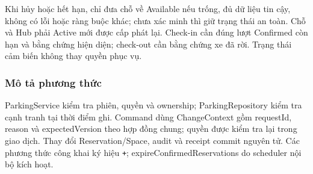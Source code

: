 Khi hủy hoặc hết hạn, chỉ đưa chỗ về Available nếu trống, đủ dữ liệu tin cậy, không có lỗi hoặc ràng buộc khác; chưa xác minh thì giữ trạng thái an toàn. Chỗ và Hub phải Active mới được cấp phát lại. Check-in cần đúng lượt Confirmed còn hạn và bằng chứng hiện diện; check-out cần bằng chứng xe đã rời. Trạng thái cảm biến không thay quyền phục vụ.

\subsubsection{Mô tả phương thức}
ParkingService kiểm tra phiên, quyền và ownership; ParkingRepository kiểm tra cạnh tranh tại thời điểm ghi. Command dùng ChangeContext gồm requestId, reason và expectedVersion theo hợp đồng chung; quyền được kiểm tra lại trong giao dịch. Thay đổi Reservation/Space, audit và receipt commit nguyên tử. Các phương thức công khai ký hiệu \texttt{+}; expireConfirmedReservations do scheduler nội bộ kích hoạt.


